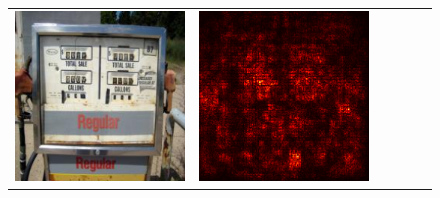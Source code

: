 \documentclass[preprint,12pt]{elsarticle}
\begin{document}
\begin{figure}[p]
\begin{tabular}{cccccc}
  \includegraphics[scale=\scale]{../visualizations/examples/imagenette/resnet18/images/9.png} &
  \includegraphics[scale=\scale]{../visualizations/examples/imagenette/resnet18/saliency_map/9.png} & 

\end{tabular}
\end{figure}
\end{document}
